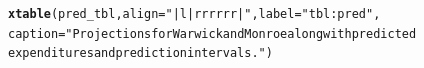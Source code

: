 \documentclass{article}\usepackage[]{graphicx}\usepackage[]{color}
\makeatletter
\newcommand{\hlstr}[1]{\textcolor[rgb]{0.192,0.494,0.8}{#1}}%
\newcommand{\hlstd}[1]{\textcolor[rgb]{0.345,0.345,0.345}{#1}}%
\newcommand{\hlkwc}[1]{\textcolor[rgb]{0.333,0.667,0.333}{#1}}%
\newcommand{\hlkwd}[1]{\textcolor[rgb]{0.737,0.353,0.396}{\textbf{#1}}}%
\newenvironment{kframe}{%
 \def\at@end@of@kframe{}%
 \ifinner\ifhmode%
  \def\at@end@of@kframe{\end{minipage}}%
  \begin{minipage}{\columnwidth}%
 \fi\fi%
 \def\FrameCommand##1{\hskip\@totalleftmargin \hskip-\fboxsep
 \colorbox{shadecolor}{##1}\hskip-\fboxsep
     \hskip-\linewidth \hskip-\@totalleftmargin \hskip\columnwidth}%
 \MakeFramed {\advance\hsize-\width
   \@totalleftmargin\z@ \linewidth\hsize
   \@setminipage}}%
 {\par\unskip\endMakeFramed%
 \at@end@of@kframe}
\newenvironment{knitrout}{}{} %
\makeatother
\begin{document}
\begin{appendices}
\begin{knitrout}
\begin{kframe}
\begin{alltt}
\hlkwd{xtable}\hlstd{(pred_tbl,} \hlkwc{align} \hlstd{=} \hlstr{"|l|rrrrrr|"}\hlstd{,} \hlkwc{label} \hlstd{=} \hlstr{"tbl:pred"}\hlstd{,}
       \hlkwc{caption} \hlstd{=} \hlstr{"Projections for Warwick and Monroe along with predicted
       expenditures and prediction intervals."}\hlstd{)}
\end{alltt}
\end{kframe}
\end{knitrout}



\end{appendices}
\end{document}
